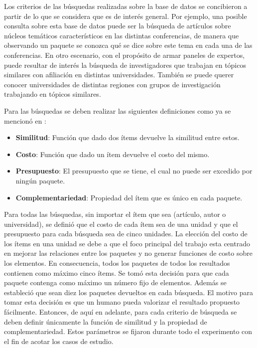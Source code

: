 Los criterios de las búsquedas realizadas sobre la base de datos se concibieron a partir de lo que se considera que es de interés general. Por ejemplo, una posible consulta sobre esta base de datos puede ser la búsqueda de artículos sobre núcleos temáticos característicos en las distintas conferencias, de manera que observando un paquete se conozca qué se dice sobre este tema en cada una de las conferencias. En otro escenario, con el propósito de armar paneles de expertos, puede resultar de interés la búsqueda de investigadores que trabajan en tópicos similares con afiliación en distintas universidades. También se puede querer conocer universidades de distintas regiones con grupos de investigación trabajando en tópicos similares.

Para las búsquedas se deben realizar las siguientes definiciones como ya se mencionó en \cite{journals/tkde/Amer-YahiaBCFMZ14}:
\begin{itemize}
  \item \textbf{Similitud}: Función que dado dos ítems devuelve la similitud entre estos.
  \item \textbf{Costo}: Función que dado un ítem devuelve el costo del mismo.
  \item \textbf{Presupuesto}: El presupuesto que se tiene, el cual no puede ser excedido por ningún paquete.
  \item \textbf{Complementariedad}: Propiedad del ítem que es único en cada paquete.
\end{itemize}

Para todas las búsquedas, sin importar el ítem que sea (artículo, autor o universidad), se definió que el costo de cada ítem sea de una unidad y que el presupuesto para cada búsqueda sea de cinco unidades. La elección del costo de los ítems en una unidad se debe a que el foco principal del trabajo esta centrado en mejorar las relaciones entre los paquetes y no generar funciones de costo sobre los elementos. En consecuencia, todos los paquetes de todos los resultados contienen como máximo cinco ítems. Se tomó esta decisión para que cada paquete contenga como máximo un número fijo de elementos. Además se estableció que sean diez los paquetes devueltos en cada búsqueda. El motivo para tomar esta decisión es que un humano pueda valorizar el resultado propuesto fácilmente. Entonces, de aquí en adelante, para cada criterio de búsqueda se deben definir únicamente la función de similitud y la propiedad de complementariedad. Estos parámetros se fijaron durante todo el experimento con el fin de acotar los casos de estudio.

